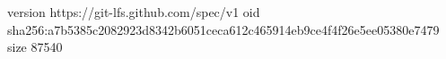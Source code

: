 version https://git-lfs.github.com/spec/v1
oid sha256:a7b5385c2082923d8342b6051ceca612c465914eb9ce4f4f26e5ee05380e7479
size 87540
